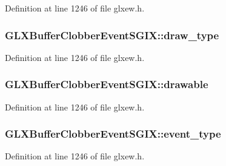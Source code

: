 Definition at line 1246 of file glxew.\-h.

\hypertarget{struct_g_l_x_buffer_clobber_event_s_g_i_x_a25c31e8cbec0919f74a1e93ae74175b1}{
\subsubsection[{draw\-\_\-type}]{ G\-L\-X\-Buffer\-Clobber\-Event\-S\-G\-I\-X\-::draw\-\_\-type}}\label{struct_g_l_x_buffer_clobber_event_s_g_i_x_a25c31e8cbec0919f74a1e93ae74175b1}


Definition at line 1246 of file glxew.\-h.

\hypertarget{struct_g_l_x_buffer_clobber_event_s_g_i_x_a9c45674193ed80a79261c3b7518ee04f}{
\subsubsection[{drawable}]{ G\-L\-X\-Buffer\-Clobber\-Event\-S\-G\-I\-X\-::drawable}}\label{struct_g_l_x_buffer_clobber_event_s_g_i_x_a9c45674193ed80a79261c3b7518ee04f}


Definition at line 1246 of file glxew.\-h.

\hypertarget{struct_g_l_x_buffer_clobber_event_s_g_i_x_a0b405123f1d6528f1f4dfa7ff92bde9b}{
\subsubsection[{event\-\_\-type}]{ G\-L\-X\-Buffer\-Clobber\-Event\-S\-G\-I\-X\-::event\-\_\-type}}\label{struct_g_l_x_buffer_clobber_event_s_g_i_x_a0b405123f1d6528f1f4dfa7ff92bde9b}


Definition at line 1246 of file glxew.\-h.

